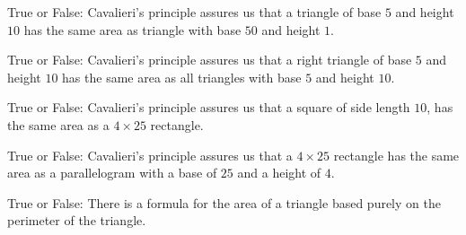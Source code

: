 \documentclass[noauthor,nooutcomes]{ximera}
\author{Bart Snapp}
\begin{document}
\maketitle



\begin{exercise}
  True or False: Cavalieri's principle assures us that a triangle of
  base $5$ and height $10$ has the same area as triangle with base
  $50$ and height $1$.
\end{exercise}

\begin{exercise}
  True or False: Cavalieri's principle assures us that a right
  triangle of base $5$ and height $10$ has the same area as all
  triangles with base $5$ and height $10$.
\end{exercise}

\begin{exercise}
  True or False: Cavalieri's principle assures us that a square of
  side length $10$, has the same area as a $4\times 25$ rectangle.
\end{exercise}


\begin{exercise}
  True or False: Cavalieri's principle assures us that a $4\times 25$
  rectangle has the same area as a parallelogram with a base of $25$
  and a height of $4$.
\end{exercise}








\begin{exercise}
  True or False: There is a formula for the area of a triangle based
  purely on the perimeter of the triangle.
\end{exercise}


\end{document}
